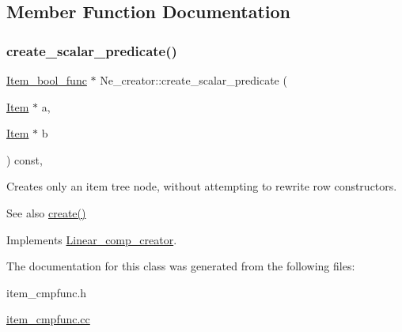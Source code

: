 \subsection{Member Function Documentation}
\mbox{\label{classNe__creator_a588788bd9c5388d4b11bd206690af928}} 
\subsubsection{\texorpdfstring{create\+\_\+scalar\+\_\+predicate()}{create\_scalar\_predicate()}}
{\footnotesize\ttfamily \mbox{\hyperlink{classItem__bool__func}{Item\+\_\+bool\+\_\+func}} $\ast$ Ne\+\_\+creator\+::create\+\_\+scalar\+\_\+predicate (\begin{DoxyParamCaption}\item[{\mbox{\hyperlink{classItem}{Item}} $\ast$}]{a,  }\item[{\mbox{\hyperlink{classItem}{Item}} $\ast$}]{b }\end{DoxyParamCaption}) const\hspace{0.3cm}{\ttfamily [protected]}, {\ttfamily [virtual]}}

Creates only an item tree node, without attempting to rewrite row constructors. \begin{DoxySeeAlso}{See also}
\mbox{\hyperlink{classLinear__comp__creator_abf8d17944a06f0f90a187f4d99e06319}{create()}} 
\end{DoxySeeAlso}


Implements \mbox{\hyperlink{classLinear__comp__creator_ad77c92f078a60d9026d394fa55d80a49}{Linear\+\_\+comp\+\_\+creator}}.



The documentation for this class was generated from the following files\+:\begin{DoxyCompactItemize}
\item 
item\+\_\+cmpfunc.\+h\item 
\mbox{\hyperlink{item__cmpfunc_8cc}{item\+\_\+cmpfunc.\+cc}}\end{DoxyCompactItemize}
